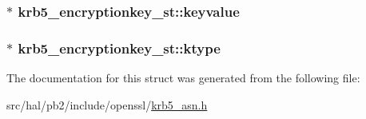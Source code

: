\subsubsection[{\texorpdfstring{keyvalue}{keyvalue}}]{$\ast$ krb5\+\_\+encryptionkey\+\_\+st\+::keyvalue}\hypertarget{structkrb5__encryptionkey__st_a6bed28f0b8e2345d51f976c57f0ec240}{}\label{structkrb5__encryptionkey__st_a6bed28f0b8e2345d51f976c57f0ec240}
\subsubsection[{\texorpdfstring{ktype}{ktype}}]{$\ast$ krb5\+\_\+encryptionkey\+\_\+st\+::ktype}\hypertarget{structkrb5__encryptionkey__st_a883042268f43cbab262213ebbb7887a9}{}\label{structkrb5__encryptionkey__st_a883042268f43cbab262213ebbb7887a9}


The documentation for this struct was generated from the following file\+:\begin{DoxyCompactItemize}
\item 
src/hal/pb2/include/openssl/\hyperlink{krb5__asn_8h}{krb5\+\_\+asn.\+h}\end{DoxyCompactItemize}

